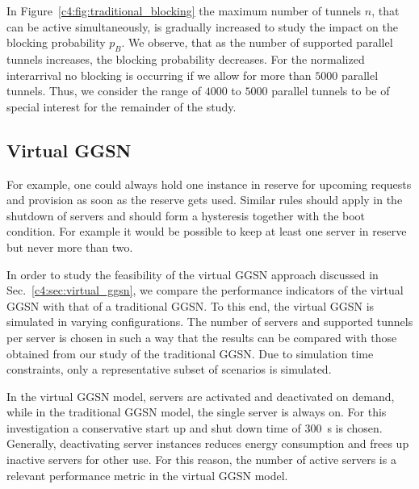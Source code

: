 In Figure~\ref{c4:fig:traditional_blocking} the maximum number of tunnels $n$, that can be active simultaneously, is gradually increased to study the impact on the blocking probability $p_B$. We observe, that as the number of supported parallel tunnels increases, the blocking probability decreases. For the normalized interarrival no blocking is occurring if we allow for more than $5000$ parallel tunnels. Thus, we consider the range of $4000$ to $5000$ parallel tunnels to be of special interest for the remainder of the study.


\subsection{Virtual \texorpdfstring{\acrshort{GGSN}}{GGSN}}
\label{c4:sec:eval_ideal_virtual_ggsn}

For example, one could always hold one instance in reserve for upcoming requests and provision as soon as the reserve gets used. Similar rules should apply in the shutdown of servers and should form a hysteresis together with the boot condition. 
For example it would be possible to keep at least one server in reserve but never more than two.

In order to study the feasibility of the virtual \gls{GGSN} approach discussed in Sec.~\ref{c4:sec:virtual_ggsn}, we compare the performance indicators of the virtual \gls{GGSN} with that of a traditional \gls{GGSN}. To this end, the virtual \gls{GGSN} is simulated in varying configurations.
The number of servers and supported tunnels per server is chosen in such a way that the results can be compared with those obtained from our study of the traditional \gls{GGSN}. Due to simulation time constraints, only a representative subset of scenarios is simulated.

In the virtual \gls{GGSN} model, servers are activated and deactivated on demand, while in the traditional \gls{GGSN} model, the single server is always on. For this investigation a conservative start up and shut down time of \SI{300}{\second} is chosen. Generally, deactivating server instances reduces energy consumption and frees up inactive servers for other use. For this reason, the number of active servers is a relevant performance metric in the virtual \gls{GGSN} model.


